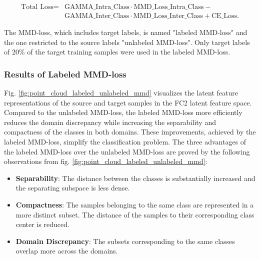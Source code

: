 \begin{equation}
\begin{split}
    \mbox{Total Loss} = & \mbox{GAMMA\_Intra\_Class}  \cdot \mbox{MMD\_Loss\_Intra\_Class} - \\
                              &\mbox{GAMMA\_Inter\_Class} \cdot \mbox{MMD\_Loss\_Inter\_Class} + \mbox{CE\_Loss}.
\end{split}
\end{equation}

The MMD-loss, which includes target labels, is named "labeled MMD-loss" and the one restricted to the source labels "unlabeled MMD-loss". Only target labels of 20\% of the target training samples were used in the labeled MMD-loss.

\subsubsection{Results of Labeled MMD-loss}
Fig. \ref{fig:point_cloud_labeled_unlabeled_mmd} visualizes the latent feature representations of the source and target samples in the FC2 latent feature space. Compared to the unlabeled MMD-loss, the labeled MMD-loss more efficiently reduces the domain discrepancy while increasing the separability and compactness of the classes in both domains. These improvements, achieved by the labeled MMD-loss, simplify the classification problem. The three advantages of the labeled MMD-loss over the unlabeled MMD-loss are proved by the following observations from fig. \ref{fig:point_cloud_labeled_unlabeled_mmd}:
\begin{itemize}
    \item \textbf{Separability}: The distance between the classes is substantially increased and the separating subspace is less dense.
    \item \textbf{Compactness}: The samples belonging to the same class are represented in a more distinct subset. The distance of the samples to their corresponding class center is reduced. 
    \item \textbf{Domain Discrepancy}: The subsets corresponding to the same classes overlap more across the domains.
\end{itemize}

